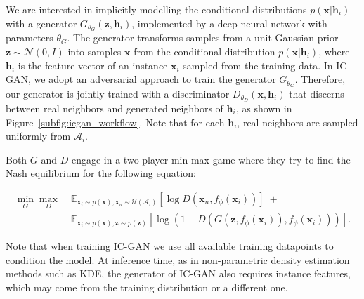 We are interested in implicitly modelling the conditional distributions $p(\mathbf{x}|\mathbf{h}_i)$ with a generator $G_{\theta_G}(\mathbf{z}, \mathbf{h}_i)$, implemented by a deep neural network with parameters $\theta_G$. The generator transforms samples from a unit Gaussian prior $\mathbf{z}\sim \mathcal{N}(0,I)$ into samples $\mathbf{x}$ from the conditional distribution $p(\mathbf{x}|\mathbf{h}_i)$, where $\mathbf{h}_i$ is the feature vector of an instance $\mathbf{x}_i$ sampled from the training data. In {IC-GAN}, we adopt an adversarial approach to train the generator $G_{\theta_G}$. Therefore, our generator is jointly trained with a discriminator $D_{\theta_D}(\mathbf{x}, \mathbf{h}_i)$ that discerns between real neighbors and generated neighbors of $\mathbf{h}_i$, as shown in Figure~\ref{subfig:icgan_workflow}.
Note that for each $\mathbf{h}_i$, real neighbors are sampled uniformly from $\mathcal{A}_i$.

Both $G$ and $D$ engage in a two player min-max game where they try to find the Nash equilibrium for the following equation:

\begin{equation}
\begin{split}
\min_{G}\max_{D} \; &  \mathbb{E}_{\mathbf{x}_i\sim p(\mathbf{x}), \mathbf{x}_n\sim \mathcal{U}(\mathcal{A}_i)} [\log D(\mathbf{x}_n, f_{\phi}(\mathbf{x}_i))] \; + \\ &  \mathbb{E}_{ \mathbf{x}_i\sim p(\mathbf{x}),\mathbf{z}\sim p(\mathbf{z}) } [\log(1-D(G(\mathbf{z}, f_{\phi}(\mathbf{x}_i)), f_{\phi}(\mathbf{x}_i)))].
\end{split}
\end{equation}

Note that when training {IC-GAN} we use all available training datapoints to condition the model. At inference time, as in non-parametric density estimation methods such as KDE, the generator of {IC-GAN} also requires instance features, which may come from the training distribution or a different one.  

